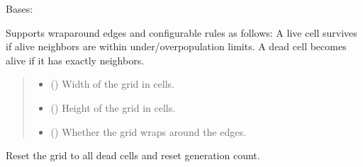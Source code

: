 \documentclass[letterpaper,10pt,oneside,english]{sphinxhowto}
\begin{document}
\begin{fulllineitems}
\label{\detokenize{core:core.game_of_life.GameOfLife}}
\pysigstartsignatures
\pysiglinewithargsret
{}
{\sphinxparamcomma {}\sphinxparamcomma {}}
{}
\pysigstopsignatures
\sphinxAtStartPar
Bases: 

\sphinxAtStartPar
Supports wraparound edges and configurable rules as follows:
A live cell survives if alive neighbors are within under/overpopulation limits.
A dead cell becomes alive if it has exactly  neighbors.
\begin{quote}\begin{description}
\begin{itemize}
\item {} 
\sphinxAtStartPar
{} () \textendash{} Width of the grid in cells.

\item {} 
\sphinxAtStartPar
{} () \textendash{} Height of the grid in cells.

\item {} 
\sphinxAtStartPar
{} () \textendash{} Whether the grid wraps around the edges.

\end{itemize}

\end{description}\end{quote}

\begin{fulllineitems}
\label{\detokenize{core:core.game_of_life.GameOfLife.clear}}
\pysigstartsignatures
\pysiglinewithargsret
{}
{}
{}
\pysigstopsignatures
\sphinxAtStartPar
Reset the grid to all dead cells and reset generation count.


\end{fulllineitems}
\end{fulllineitems}
\end{document}
